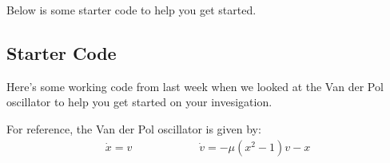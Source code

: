 \documentclass[letterpaper,10pt,english]{jupyterBook}
\begin{document}
\sphinxAtStartPar
Below is some starter code to help you get started.


\subsection{Starter Code}
\label{\detokenize{content/1_mechanics/ODE_games:starter-code}}
\sphinxAtStartPar
Here’s some working code from last week when we looked at the Van der Pol oscillator to help you get started on your invesigation.

\sphinxAtStartPar
For reference, the Van der Pol oscillator is given by:
\begin{equation*}
\begin{split}
\dot{x} = v \hspace{1in} \dot{v} = -\mu (x^2 - 1)v - x
\end{split}
\end{equation*}
\end{document}
